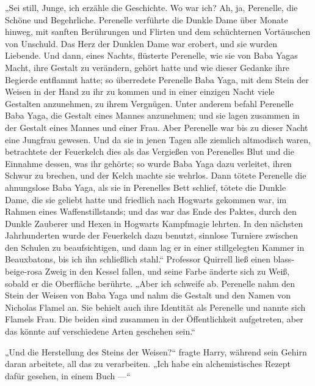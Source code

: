 „Sei still, Junge, ich erzähle die Geschichte. Wo war ich? Ah, ja, Perenelle, die Schöne und Begehrliche. Perenelle verführte die Dunkle Dame über Monate hinweg, mit sanften Berührungen und Flirten und dem schüchternen Vortäuschen von Unschuld. Das Herz der Dunklen Dame war erobert, und sie wurden Liebende. Und dann, eines Nachts, flüsterte Perenelle, wie sie von Baba Yagas Macht, ihre Gestalt zu verändern, gehört hatte und wie dieser Gedanke ihre Begierde entflammt hatte; so überredete Perenelle Baba Yaga, mit dem Stein der Weisen in der Hand zu ihr zu kommen und in einer einzigen Nacht viele Gestalten anzunehmen, zu ihrem Vergnügen. Unter anderem befahl Perenelle Baba Yaga, die Gestalt eines Mannes anzunehmen; und sie lagen zusammen in der Gestalt eines Mannes und einer Frau. Aber Perenelle war bis zu dieser Nacht eine Jungfrau gewesen. Und da sie in jenen Tagen alle ziemlich altmodisch waren, betrachtete der Feuerkelch dies als das Vergießen von Perenelles Blut und die Einnahme dessen, was ihr gehörte; so wurde Baba Yaga dazu verleitet, ihren Schwur zu brechen, und der Kelch machte sie wehrlos. Dann tötete Perenelle die ahnungslose Baba Yaga, als sie in Perenelles Bett schlief, tötete die Dunkle Dame, die sie geliebt hatte und friedlich nach Hogwarts gekommen war, im Rahmen eines Waffenstillstands; und das war das Ende des Paktes, durch den Dunkle Zauberer und Hexen in Hogwarts Kampfmagie lehrten. In den nächsten Jahrhunderten wurde der Feuerkelch dazu benutzt, sinnlose Turniere zwischen den Schulen zu beaufsichtigen, und dann lag er in einer stillgelegten Kammer in Beauxbatons, bis ich ihn schließlich stahl.“
Professor Quirrell ließ einen blass-beige-rosa Zweig in den Kessel fallen, und seine Farbe änderte sich zu Weiß, sobald er die Oberfläche berührte.
„Aber ich schweife ab. Perenelle nahm den Stein der Weisen von Baba Yaga und nahm die Gestalt und den Namen von Nicholas Flamel an. Sie behielt auch ihre Identität als Perenelle und nannte sich Flamels Frau. Die beiden sind zusammen in der Öffentlichkeit aufgetreten, aber das könnte auf verschiedene Arten geschehen sein.“

„Und die Herstellung des Steins der Weisen?“ fragte Harry, während sein Gehirn daran arbeitete, all das zu verarbeiten.
„Ich habe ein alchemistisches Rezept dafür gesehen, in einem Buch —“

